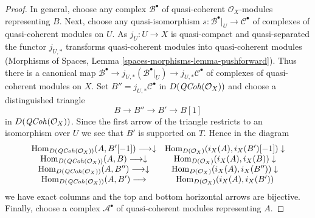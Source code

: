 \begin{proof}
\medskip\noindent
In general, choose any complex $\mathcal{B}^\bullet$ of quasi-coherent
$\mathcal{O}_X$-modules representing $B$. Next, choose any quasi-isomorphism
$s : \mathcal{B}^\bullet|_U \to \mathcal{C}^\bullet$ of complexes of
quasi-coherent modules on $U$. As $j_U : U \to X$ is
quasi-compact and quasi-separated the functor $j_{U, *}$ transforms
quasi-coherent modules into quasi-coherent modules
(Morphisms of Spaces, Lemma \ref{spaces-morphisms-lemma-pushforward}).
Thus there is a canonical map
$\mathcal{B}^\bullet \to j_{U, *}(\mathcal{B}^\bullet|_U) \to
j_{U, *}\mathcal{C}^\bullet$
of complexes of quasi-coherent modules on $X$.
Set $B'' = j_{U, *}\mathcal{C}^\bullet$ in $D(\mathit{QCoh}(\mathcal{O}_X))$
and choose a distinguished triangle
$$
B \to B'' \to B' \to B[1]
$$
in $D(\mathit{QCoh}(\mathcal{O}_X))$. Since the first arrow of the triangle
restricts to an isomorphism over $U$ we see that $B'$ is supported on $T$.
Hence in the diagram
$$
\begin{array}{cc}\operatorname{Hom}_{D(\mathit{QCoh}(\mathcal{O}_X))}(A, B'[-1]) \longrightarrow\downarrow & \operatorname{Hom}_{D(\mathcal{O}_X)}(i_X(A), i_X(B')[-1]) \downarrow \\ \operatorname{Hom}_{D(\mathit{QCoh}(\mathcal{O}_X))}(A, B) \longrightarrow\downarrow & \operatorname{Hom}_{D(\mathcal{O}_X)}(i_X(A), i_X(B)) \downarrow \\ \operatorname{Hom}_{D(\mathit{QCoh}(\mathcal{O}_X))}(A, B'') \longrightarrow\downarrow & \operatorname{Hom}_{D(\mathcal{O}_X)}(i_X(A), i_X(B'')) \downarrow \\ \operatorname{Hom}_{D(\mathit{QCoh}(\mathcal{O}_X))}(A, B') \longrightarrow & \operatorname{Hom}_{D(\mathcal{O}_X)}(i_X(A), i_X(B'))\end{array}
$$
we have exact columns and the top and bottom horizontal arrows are
bijective. Finally, choose a complex $\mathcal{A}^\bullet$
of quasi-coherent modules representing $A$.


\end{proof}
